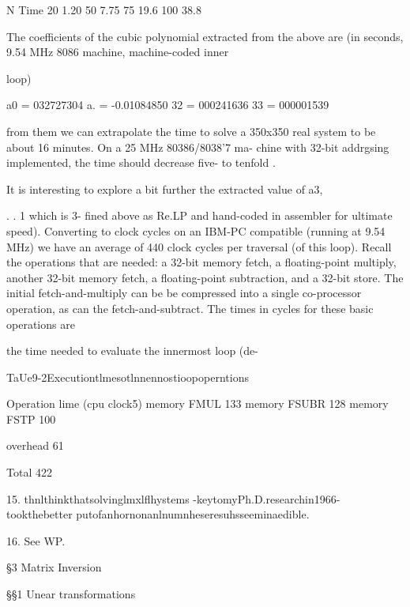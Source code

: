  

N Time
20 1.20
50 7.75
75 19.6
100 38.8

 

 

 

The coefficients of the cubic polynomial extracted from the above
are (in seconds, 9.54 MHz 8086 machine, machine-coded inner

loop)

a0 = 032727304
a. = -0.01084850
32 = 000241636
33 = 000001539

from them we can extrapolate the time to solve a 350x350 real
system to be about 16 minutes. On a 25 MHz 80386/8038'7 ma-
chine with 32-bit addrgsing implemented, the time should
decrease five- to tenfold .

It is interesting to explore a bit further the extracted value of a3,

. . 1
which is 3-
fined above as Re.LP and hand-coded in assembler for ultimate
speed). Converting to clock cycles on an IBM-PC compatible
(running at 9.54 MHz) we have an average of 440 clock cycles per
traversal (of this loop). Recall the operations that are needed: a
32-bit memory fetch, a floating-point multiply, another 32-bit
memory fetch, a floating-point subtraction, and a 32-bit store.
The initial fetch-and-multiply can be be compressed into a single
co-processor operation, as can the fetch-and-subtract. The times
in cycles for these basic operations are

the time needed to evaluate the innermost loop (de-

TaUe9-2Executiontlmesotlnnennostioopoperntions

 

Operation lime (cpu clock5)
memory FMUL 133
memory FSUBR 128
memory FSTP 100

overhead 61

 

Total 422

 

 

 

 

15. thnlthinkthatsolvinglmxlflhystems -keytomyPh.D.researchin1966- tookthebetter
putofanhornonanlnumnheseresuhsseeminaedible.

16. See WP.



\S3 Matrix Inversion

\S\S1 Unear transformations

